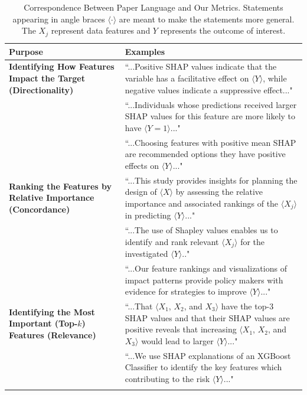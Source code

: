 \documentclass[mnsc,blindrev]{informs3}
\begin{document}
\begin{table}[htbp]
\small
\caption{Correspondence Between Paper Language and Our Metrics.  Statements appearing in angle braces $\langle \cdot \rangle$ 
are meant to make the statements more general. The $X_j$ represent data features and $Y$ represents the outcome of interest.}
\begin{tabu} to 1
\toprule
\textbf{Purpose} & \textbf{Examples} \\
\hline
\textbf{Identifying How Features Impact the Target (Directionality)}
& ``...Positive SHAP values indicate that the variable has a facilitative effect on $\langle Y\rangle$, while negative values indicate a suppressive effect..." \\ 
& \vspace{-.8cm}``...Individuals whose predictions received larger SHAP values for this feature are more likely to have $\langle Y=1\rangle$..."\\
& ``...Choosing features with positive mean SHAP are recommended options they have positive effects on $\langle Y\rangle$..." \\
\hline
\textbf{Ranking the Features by Relative Importance (Concordance)}
& ``...This study provides insights for planning the design of $\langle X\rangle$ by assessing the relative importance and associated rankings of the $\langle X_j\rangle$ in predicting $\langle Y\rangle$..."\\\smallskip
& \vspace{-.8cm}``...The use of Shapley values enables us to identify and rank relevant $\langle X_j\rangle$ for the investigated $\langle Y\rangle$.."\\\smallskip
& ``...Our feature rankings and visualizations of impact patterns provide policy makers with evidence for strategies to improve $\langle Y\rangle$..." \\
\hline
\textbf{Identifying the Most Important (Top-$k$) Features (Relevance)\hspace{3cm}}
& ``...That $\langle X_1$, $X_2$, and $X_3\rangle$ have the top-3 SHAP values and that their SHAP values are positive reveals that increasing $\langle X_1$, $X_2$, and $X_3\rangle$ would lead to larger $\langle Y\rangle$..."\\\smallskip
& \vspace{-.8cm}``...We use SHAP explanations of an XGBoost Classifier to identify the key features which contributing to the risk $\langle Y\rangle$..."\\\smallskip

\end{tabu}
\end{table}
\end{document}
